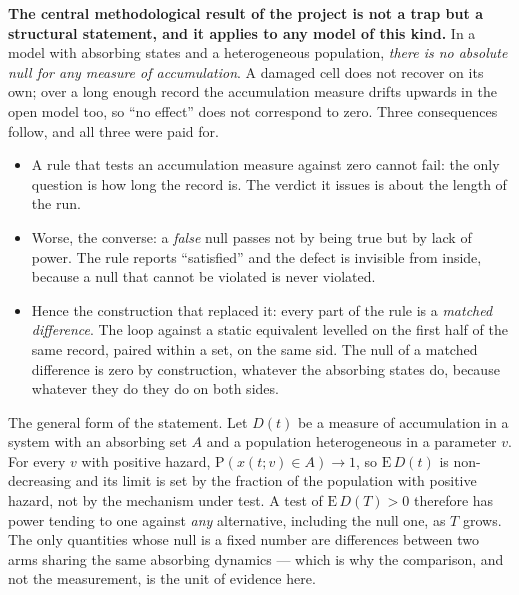 \textbf{The central methodological result of the project is not a trap but a structural statement, and it applies to any model of this kind.} In a model with absorbing states and a heterogeneous population, \emph{there is no absolute null for any measure of accumulation}. A damaged cell does not recover on its own; over a long enough record the accumulation measure drifts upwards in the open model too, so ``no effect'' does not correspond to zero. Three consequences follow, and all three were paid for.

\begin{itemize}
\item A rule that tests an accumulation measure against zero cannot fail: the only question is how long the record is. The verdict it issues is about the length of the run.
\item Worse, the converse: a \emph{false} null passes not by being true but by lack of power. The rule reports ``satisfied'' and the defect is invisible from inside, because a null that cannot be violated is never violated.
\item Hence the construction that replaced it: every part of the rule is a \emph{matched difference}. The loop against a static equivalent levelled on the first half of the same record, paired within a set, on the same sid. The null of a matched difference is zero by construction, whatever the absorbing states do, because whatever they do they do on both sides.
\end{itemize}

\begin{ineq}
The general form of the statement. Let $D(t)$ be a measure of accumulation in a system with an absorbing set $A$ and a population heterogeneous in a parameter $v$. For every $v$ with positive hazard, $\mathrm{P}(x(t;v)\in A)\to1$, so $\mathrm{E}\,D(t)$ is non-decreasing and its limit is set by the fraction of the population with positive hazard, not by the mechanism under test. A test of $\mathrm{E}\,D(T)>0$ therefore has power tending to one against \emph{any} alternative, including the null one, as $T$ grows. The only quantities whose null is a fixed number are differences between two arms sharing the same absorbing dynamics --- which is why the comparison, and not the measurement, is the unit of evidence here.
\end{ineq}
